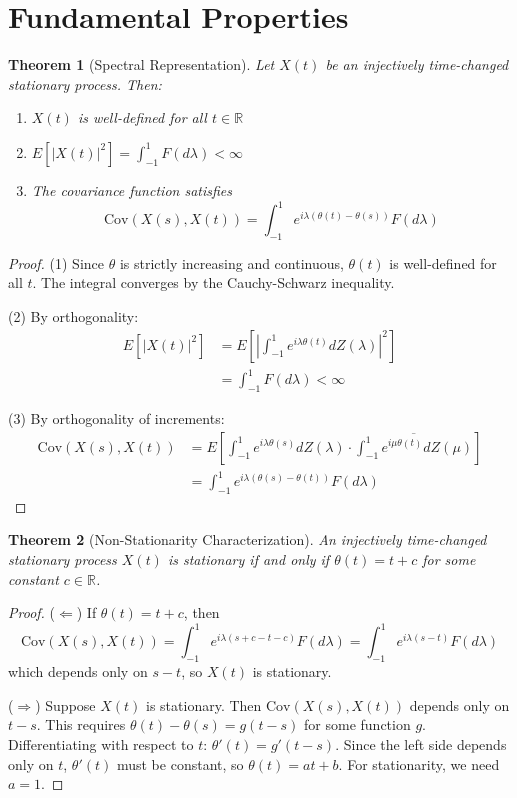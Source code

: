 \documentclass[11pt]{article}
\newtheorem{theorem}{Theorem}
\begin{document}
\section{Fundamental Properties}

\begin{theorem}[Spectral Representation]
Let $X(t)$ be an injectively time-changed stationary process. Then:
\begin{enumerate}
\item $X(t)$ is well-defined for all $t \in \mathbb{R}$
\item $E[|X(t)|^2] = \int_{-1}^1 F(d\lambda) < \infty$
\item The covariance function satisfies
\begin{equation}
\text{Cov}(X(s),X(t)) = \int_{-1}^1 e^{i\lambda(\theta(t)-\theta(s))} F(d\lambda)
\end{equation}
\end{enumerate}
\end{theorem}

\begin{proof}
(1) Since $\theta$ is strictly increasing and continuous, $\theta(t)$ is well-defined for all $t$. The integral converges by the Cauchy-Schwarz inequality.

(2) By orthogonality:
\begin{align}
E[|X(t)|^2] &= E\left[\left|\int_{-1}^1 e^{i\lambda\theta(t)} dZ(\lambda)\right|^2\right]\\
&= \int_{-1}^1 F(d\lambda) < \infty
\end{align}

(3) By orthogonality of increments:
\begin{align}
\text{Cov}(X(s),X(t)) &= E\left[\int_{-1}^1 e^{i\lambda\theta(s)} dZ(\lambda) \cdot \overline{\int_{-1}^1 e^{i\mu\theta(t)} dZ(\mu)}\right]\\
&= \int_{-1}^1 e^{i\lambda(\theta(s)-\theta(t))} F(d\lambda)
\end{align}
\end{proof}

\begin{theorem}[Non-Stationarity Characterization]
An injectively time-changed stationary process $X(t)$ is stationary if and only if $\theta(t) = t + c$ for some constant $c \in \mathbb{R}$.
\end{theorem}

\begin{proof}
($\Leftarrow$) If $\theta(t) = t + c$, then
\begin{equation}
\text{Cov}(X(s),X(t)) = \int_{-1}^1 e^{i\lambda(s+c-t-c)} F(d\lambda) = \int_{-1}^1 e^{i\lambda(s-t)} F(d\lambda)
\end{equation}
which depends only on $s-t$, so $X(t)$ is stationary.

($\Rightarrow$) Suppose $X(t)$ is stationary. Then $\text{Cov}(X(s),X(t))$ depends only on $t-s$. This requires $\theta(t)-\theta(s) = g(t-s)$ for some function $g$. Differentiating with respect to $t$: $\theta'(t) = g'(t-s)$. Since the left side depends only on $t$, $\theta'(t)$ must be constant, so $\theta(t) = at + b$. For stationarity, we need $a = 1$.
\end{proof}
\end{document}

